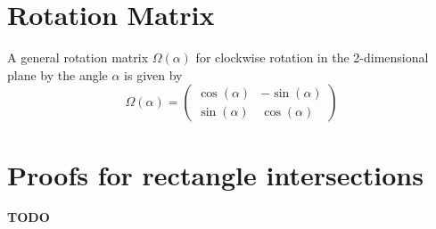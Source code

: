 \documentclass[11pt]{article}
\begin{document}
\appendix
\section{Rotation Matrix}
\label{appendix-rotation-matrix}
A general rotation matrix $\Omega(\alpha)$ for clockwise rotation in the
2-dimensional plane by the angle $\alpha$ is given by
\begin{equation}
    \Omega(\alpha) = \begin{pmatrix}
        \cos(\alpha) & -\sin(\alpha) \\
        \sin(\alpha) & \cos(\alpha)
    \end{pmatrix}
\end{equation}

\section{Proofs for rectangle intersections}
\label{appendix-proofs-rectangle-intersections}

\textbf{\color{red}TODO}
\end{document}

